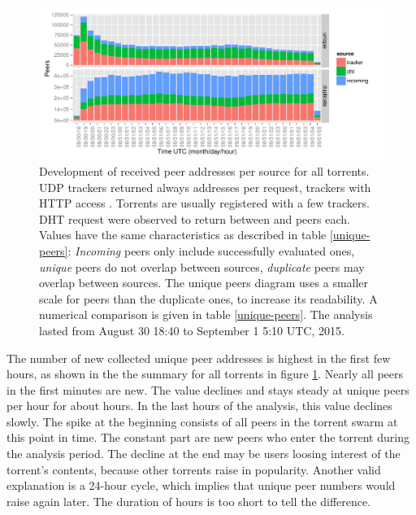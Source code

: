 \documentclass[10pt, a4paper, twoside, headsepline]{scrbook}
\renewcommand{\_}{\origunderscore\allowbreak}
\newcommand{\range}{from August 30 18:40 to September 1 5:10 UTC, 2015}
\begin{document}
\begin{figure}
\centering
\includegraphics[width=\textwidth]{../result/2015-08-30_20-combined_source_all_torrents}
\caption[Development of received peer addresses per source]{Development of received peer addresses per source for all torrents. UDP trackers returned always  addresses per request, trackers with HTTP access . Torrents are usually registered with a few trackers. DHT request were observed to return between  and  peers each. Values have the same characteristics as described in table \ref{unique-peers}: \emph{Incoming} peers only include successfully evaluated ones, \emph{unique} peers do not overlap between sources, \emph{duplicate} peers may overlap between sources. The unique peers diagram uses a smaller scale for peers than the duplicate ones, to increase its readability. A numerical comparison is given in table \ref{unique-peers}. The analysis lasted \range.}
\label{request-history}
\end{figure}

The number of new collected unique peer addresses is highest in the first few hours, as shown in the the summary for all torrents  in figure \ref{request-history}. Nearly all peers in the first  minutes are new. The value declines and stays steady at  unique peers per hour for about  hours. In the last  hours of the analysis, this value declines slowly. The spike at the beginning consists of all peers in the torrent swarm at this point in time. The constant part are new peers who enter the torrent during the analysis period. The decline at the end may be users loosing interest of the torrent's contents, because other torrents raise in popularity. Another valid explanation is a 24-hour cycle, which implies that unique peer numbers would raise again later. The duration of  hours is too short to tell the difference.
\end{document}
